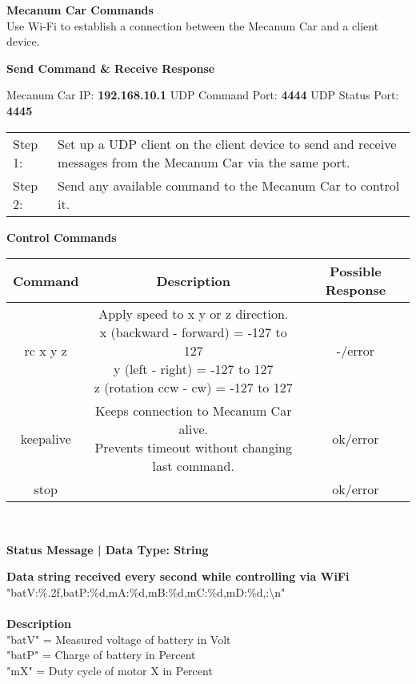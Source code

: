 
	{\Large \textbf{Mecanum Car Commands}}\\
	Use Wi-Fi to establish a connection between the Mecanum Car and a client device.\\
	\begin{tcolorbox}[width=\linewidth, sharp corners=all, colback=white!95!black, boxrule=0pt]
		{\large \textbf{Send Command \& Receive Response}}
	\end{tcolorbox}
	Mecanum Car IP: \textbf{192.168.10.1} UDP Command Port: \textbf{4444} UDP Status Port: \textbf{4445}
	
	\begin{tabular}{R{0.1\textwidth} L{0.85\textwidth}}
		Step 1:\newline \phantom{-} & Set up a UDP client on the client device to send and receive messages from the Mecanum Car via the same port. \\
		Step 2:\newline \phantom{-} & Send any available command to the Mecanum Car to control it. \\
	\end{tabular}
	
	\begin{tcolorbox}[width=\linewidth, sharp corners=all, colback=white!95!black, boxrule=0pt]
		{\large \textbf{Control Commands}}
	\end{tcolorbox}
	\begin{tabularx}{\textwidth}{c|c|c}
		\hline
		\textbf{Command} & \textbf{Description} & \textbf{Possible Response} \\
		\hline
		rc x y z & \makecell{Apply speed to  x y or z direction.\\x (backward - forward) = -127 to 127\\y (left - right) = -127 to 127\\z (rotation ccw - cw) = -127 to 127} & -/error \\
		\hline
		keepalive & \makecell{Keeps connection to Mecanum Car alive.\\Prevents timeout without changing last command.} & ok/error \\
		\hline
		stop & \makecell{Set all directions to 0.} & ok/error \\
		\hline
	\end{tabularx}
	\\
	\begin{tcolorbox}[width=\linewidth, sharp corners=all, colback=white!95!black, boxrule=0pt]
		{\large \textbf{Status Message | Data Type: String}}
	\end{tcolorbox}
	\textbf{Data string received every second while controlling via WiFi}\\
	"batV:\%.2f,batP:\%d,mA:\%d,mB:\%d,mC:\%d,mD:\%d,:\textbackslash n"\\
	\\
	\textbf{Description}\\
	"batV" = Measured voltage of battery in Volt\\
	"batP" = Charge of battery in Percent\\
	"mX" = Duty cycle of motor X in Percent\\
